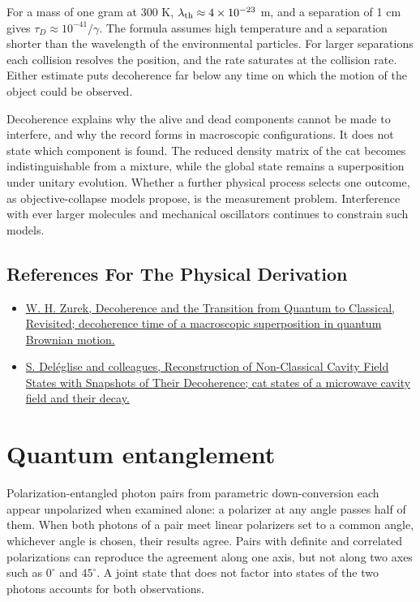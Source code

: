 \documentclass[11pt,oneside]{book}
\begin{document}
For a mass of one gram at 300 K, \(\lambda_{\rm th}\approx4\times10^{-23}\) m, and a separation of 1 cm gives \(\tau_D\approx10^{-41}/\gamma\). The formula assumes high temperature and a separation shorter than the wavelength of the environmental particles. For larger separations each collision resolves the position, and the rate saturates at the collision rate. Either estimate puts decoherence far below any time on which the motion of the object could be observed.

Decoherence explains why the alive and dead components cannot be made to interfere, and why the record forms in macroscopic configurations. It does not state which component is found. The reduced density matrix of the cat becomes indistinguishable from a mixture, while the global state remains a superposition under unitary evolution. Whether a further physical process selects one outcome, as objective-collapse models propose, is the measurement problem. Interference with ever larger molecules and mechanical oscillators continues to constrain such models.

\subsection*{References For The Physical Derivation}
\begin{itemize}
\item \href{https://arxiv.org/abs/quant-ph/0306072}{W. H. Zurek, Decoherence and the Transition from Quantum to Classical, Revisited; decoherence time of a macroscopic superposition in quantum Brownian motion.}
\item \href{https://arxiv.org/abs/0809.1064}{S. Deléglise and colleagues, Reconstruction of Non-Classical Cavity Field States with Snapshots of Their Decoherence; cat states of a microwave cavity field and their decay.}
\end{itemize}





\clearpage

\section{Quantum entanglement}

\label{topic:quantum-entanglement}

Polarization-entangled photon pairs from parametric down-conversion each appear unpolarized when examined alone: a polarizer at any angle passes half of them. When both photons of a pair meet linear polarizers set to a common angle, whichever angle is chosen, their results agree. Pairs with definite and correlated polarizations can reproduce the agreement along one axis, but not along two axes such as \(0^\circ\) and \(45^\circ\). A joint state that does not factor into states of the two photons accounts for both observations.
\end{document}
